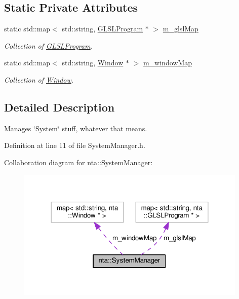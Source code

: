 \subsection*{Static Private Attributes}
\begin{DoxyCompactItemize}
\item 
\mbox{\label{classnta_1_1SystemManager_a22703ea675725af427acc8a19853fb4d}} 
static std\+::map$<$ std\+::string, \hyperlink{classnta_1_1GLSLProgram}{G\+L\+S\+L\+Program} $\ast$ $>$ \hyperlink{classnta_1_1SystemManager_a22703ea675725af427acc8a19853fb4d}{m\+\_\+glsl\+Map}
\begin{DoxyCompactList}\small\item\em Collection of \hyperlink{classnta_1_1GLSLProgram}{G\+L\+S\+L\+Program}. \end{DoxyCompactList}\item 
\mbox{\label{classnta_1_1SystemManager_ad19f3250449b0ddad40bf42601d36b1a}} 
static std\+::map$<$ std\+::string, \hyperlink{classnta_1_1Window}{Window} $\ast$ $>$ \hyperlink{classnta_1_1SystemManager_ad19f3250449b0ddad40bf42601d36b1a}{m\+\_\+window\+Map}
\begin{DoxyCompactList}\small\item\em Collection of \hyperlink{classnta_1_1Window}{Window}. \end{DoxyCompactList}\end{DoxyCompactItemize}


\subsection{Detailed Description}
Manages \char`\"{}\+System\char`\"{} stuff, whatever that means. 

Definition at line 11 of file System\+Manager.\+h.



Collaboration diagram for nta\+:\+:System\+Manager\+:\nopagebreak
\begin{figure}[H]
\begin{center}
\leavevmode
\includegraphics[width=312pt]{d5/d24/classnta_1_1SystemManager__coll__graph}
\end{center}
\end{figure}


